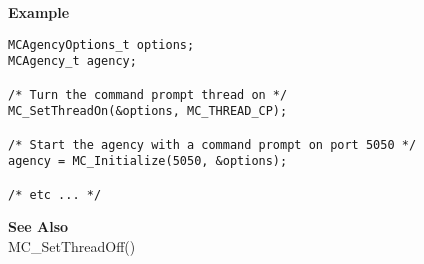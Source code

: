 \noindent
{\bf Example}\\
\noindent
\begin{verbatim}
MCAgencyOptions_t options;
MCAgency_t agency;

/* Turn the command prompt thread on */
MC_SetThreadOn(&options, MC_THREAD_CP);

/* Start the agency with a command prompt on port 5050 */
agency = MC_Initialize(5050, &options);

/* etc ... */
\end{verbatim}

\noindent
{\bf See Also}\\
MC\_SetThreadOff()\\

